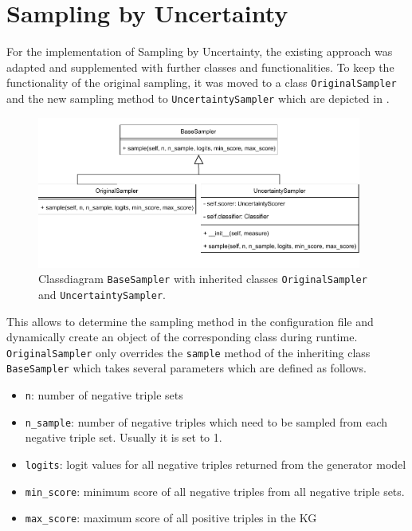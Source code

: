  \section{Sampling by Uncertainty}
 \label{sec:sampling_by_uncertainty}
 
For the implementation of Sampling by Uncertainty, the existing approach was adapted and supplemented with further classes and functionalities.
To keep the functionality of the original sampling, it was moved to a class \texttt{OriginalSampler} and the new sampling method to \texttt{UncertaintySampler} which are depicted in .
\begin{figure}[t]
  \centering
    \includegraphics[width=0.95\textwidth]{figures/classdiagrams/BaseSampler.pdf}
    \caption{Classdiagram \texttt{BaseSampler} with inherited classes \texttt{OriginalSampler} and \texttt{UncertaintySampler}.}
  \label{fig:base_sampler}
\end{figure}
This allows to determine the sampling method in the configuration file and dynamically create an object of the corresponding class during runtime.
\texttt{OriginalSampler} only overrides the \texttt{sample} method of 
the inheriting class \texttt{BaseSampler} which takes several parameters which are defined as follows.
\begin{itemize}
    \item 
    \texttt{n}: number of negative triple sets
    
    \item 
    \texttt{n\_sample}: 
    number of negative triples which need to be sampled from each negative triple set.
    Usually it is set to 1.
    
    \item 
    \texttt{logits}:
    logit values for all negative triples returned from the generator model
    
    \item 
    \texttt{min\_score}:
    minimum score of all negative triples from all negative triple sets.
    
    \item 
    \texttt{max\_score}:
    maximum score of all positive triples in the \ac{KG}
\end{itemize}
